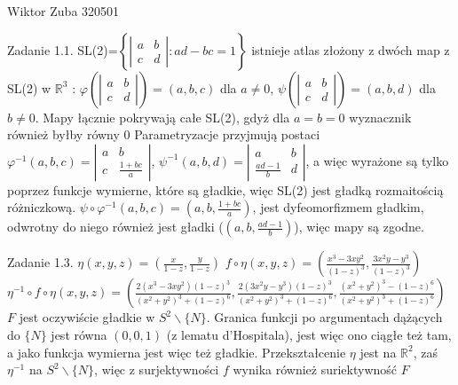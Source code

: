 \documentclass{article}
\begin{document}
Wiktor Zuba 320501
\newline

Zadanie 1.1.
\newline
\newline
SL(2)=$\left\{\left|\begin{array}{cc}a&b\\c&d\end{array}\right|:ad-bc=1\right\}$\newline
istnieje atlas złożony z dwóch map z SL(2) w $\mathbb{R}^3$ :
$\varphi(\left|\begin{array}{cc}a&b\\c&d\end{array}\right|)=(a,b,c)$ dla $a\neq0$,
$\psi(\left|\begin{array}{cc}a&b\\c&d\end{array}\right|)=(a,b,d)$ dla $b\neq0$.
Mapy łącznie pokrywają całe SL(2), gdyż dla $a=b=0$ wyznacznik również byłby równy $0$
Parametryzacje przyjmują postaci $\varphi^{-1}(a,b,c)=\left|\begin{array}{cc}a&b\\c&\frac{1+bc}{a}\end{array}\right|$,
$\psi^{-1}(a,b,d)=\left|\begin{array}{cc}a&b\\\frac{ad-1}{b}&d\end{array}\right|$,
a więc wyrażone są tylko poprzez funkcje wymierne, które są gładkie, więc SL(2) jest gładką rozmaitością różniczkową.\newline
$\psi\circ\varphi^{-1}(a,b,c)=(a,b,\frac{1+bc}{a})$, jest dyfeomorfizmem gładkim, odwrotny do niego również jest gładki ($(a,b,\frac{ad-1}{b})$), więc mapy są zgodne.
\newline

Zadanie 1.3.
\newline
\newline
$\eta(x,y,z)=(\frac{x}{1-z},\frac{y}{1-z})$\newline
$f\circ\eta(x,y,z)=(\frac{x^3-3xy^2}{(1-z)^3},\frac{3x^2y-y^3}{(1-z)^3})$\newline
$\eta^{-1}\circ f\circ\eta(x,y,z)=
(\frac{2(x^3-3xy^2)(1-z)^3}{(x^2+y^2)^3+(1-z)^6},\frac{2(3x^2y-y^3)(1-z)^3}{(x^2+y^2)^3+(1-z)^6},\frac{(x^2+y^2)^3-(1-z)^6}{(x^2+y^2)^3+(1-z)^6})$\newline
$F$ jest oczywiście gładkie w $S^2\backslash\{N\}$. Granica funkcji po argumentach dążących do $\{N\}$ jest równa $(0,0,1)$ (z lematu d'Hospitala),
jest więc ono ciągłe też tam, a jako funkcja wymierna jest więc też gładkie. Przekształcenie $\eta$ jest na $\mathbb{R}^2$, zaś $\eta^{-1}$ na $S^2\backslash\{N\}$,
więc z surjektywności $f$ wynika również suriektywność $F$
\newline
\end{document}
